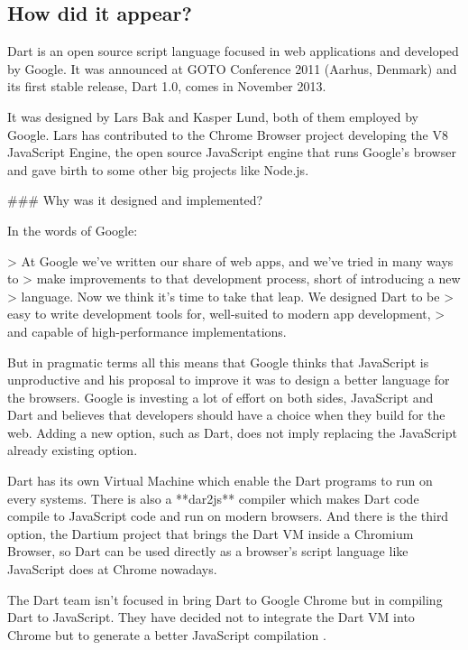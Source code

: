 \subsection{How did it appear?}

Dart is an open source script language focused in web applications and developed
by Google\cite{3_1}. It was announced at GOTO
Conference 2011 (Aarhus, Denmark)\cite{3_2} and
its first stable release, Dart 1.0, comes in November
2013\cite{3_3}.

It was designed by Lars Bak and Kasper Lund, both of them employed by Google.
Lars has contributed to the Chrome Browser project developing the V8 JavaScript
Engine\cite{3_4}, the open source JavaScript
engine that runs Google's browser and gave birth to some other big projects like
Node.js\cite{3_5}.

### Why was it designed and implemented?

In the words of Google\cite{3_6}:

> At Google we’ve written our share of web apps, and we’ve tried in many ways to
> make improvements to that development process, short of introducing a new
> language. Now we think it’s time to take that leap. We designed Dart to be
> easy to write development tools for, well-suited to modern app development,
> and capable of high-performance implementations.

But in pragmatic terms all this means that Google thinks that JavaScript is
unproductive and his proposal to improve it was to design a better language for
the browsers. Google is investing a lot of effort on both sides, JavaScript
and Dart\cite{3_7} and believes that developers
should have a choice when they build for the web. Adding a new option, such as
Dart, does not imply replacing the JavaScript already existing 
option\cite{3_8}.

Dart has its own Virtual Machine which enable the Dart programs to run on every
systems. There is also a **dar2js** compiler which makes Dart code compile to
JavaScript code and run on modern browsers. And there is the third option, the
Dartium\cite{3_9} project that brings the Dart VM
inside a Chromium Browser, so Dart can be used directly as a browser's script
language like JavaScript does at Chrome nowadays.

The Dart team isn't focused in bring Dart to Google Chrome but in compiling Dart
to JavaScript. They have decided not to integrate the Dart VM into
Chrome but to generate a better JavaScript compilation\cite{3_10}
\cite{3_11}.

